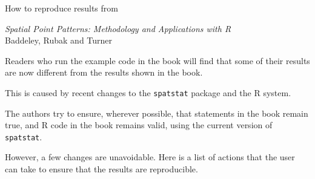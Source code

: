\documentclass[12pt,a4paper]{article}
\begin{document}
\thispagestyle{empty}
\begin{center}
  \begin{Large}
    How to reproduce results from
  \end{Large}

  \begin{large}
    \emph{Spatial Point Patterns: Methodology and Applications with R}\\
    Baddeley, Rubak and Turner
  \end{large}
\end{center}

Readers who run the example code in the book
will find that some of their results are
now different from the results shown in the book.

This is caused by recent changes to the \texttt{spatstat} package
and the \textsf{R} system.

The authors try to ensure, wherever possible, that statements in the book
remain true, and \textsf{R} code in the book remains valid, 
using the current version of \texttt{spatstat}.

However, a few changes are unavoidable. Here is a list of actions that
the user can take to ensure that the results are reproducible.
\end{document}
